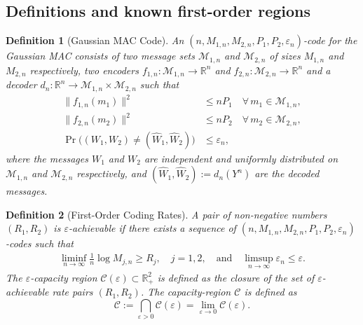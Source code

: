 \documentclass[11pt,onecolumn]{IEEEtran}
\newcommand{\calC}{\mathcal{C}}
\newcommand{\calM}{\mathcal{M}}
\newcommand{\bbR}{\mathbb{R}}
\newcommand{\hatW}{\hat{W}}
\newcommand{\eps}{\varepsilon}
\newtheorem{definition}{Definition}
\begin{document}
\subsection{Definitions and known first-order regions}
\begin{definition}[Gaussian MAC Code] \label{def:code}
An  {\em $(n,M_{1,n},M_{2,n},P_1, P_2,\eps_n)$-code}  for the Gaussian MAC consists of two message sets $\calM_{1,n}$ and $ \calM_{2,n}$ of sizes $M_{1,n}$ and $M_{2,n}$ respectively, two encoders $f_{1,n} : \calM_{1,n}\to \bbR^n$ and      $f_{2,n} : \calM_{2,n}\to\bbR^n$  and a decoder    $d_n : \bbR^n\to \calM_{1,n} \times \calM_{2,n}$ such that
\begin{align}
  \|f_{1,n}(m_1)\|^2 &\le n P_1    \quad\forall  \, m_1 \in \calM_{1,n}  , \label{eqn:power1} \\
 \|f_{2,n}(m_2)\|^2&\le n P_2    \quad\forall \,   m_2 \in  \calM_{2,n}   \label{eqn:power2}, \\
\Pr\big( (W_1, W_2)\ne (\hatW_1,\hatW_2) \big)  &\le\eps_n , \label{eqn:error_prob1}
\end{align}
where the messages $W_1$ and $W_2$ are independent and uniformly distributed on $\calM_{1,n}$ and $\calM_{2,n}$ respectively, and $(\hatW_1,\hatW_2) :=d_n(Y^n)$ are the decoded messages. 
\end{definition}


\begin{definition}[First-Order Coding Rates]
A pair of  non-negative numbers $(R_1, R_2)$ is {\em $\eps$-achievable} if there exists a sequence of $(n,M_{1,n},M_{2,n},P_1, P_2,\eps_n)$-codes such that  
\begin{align}
\liminf_{n\to\infty}\frac{1}{n}\log M_{j,n} \ge R_j,\quad j = 1,2,\quad\mbox{and}\quad \limsup_{n\to\infty}\eps_n \le \eps.
\end{align}
The {\em $\eps$-capacity region} $\calC(\eps) \subset\bbR_+^2$ is defined as the closure of the set of  $\eps$-achievable rate pairs $(R_1, R_2)$.  The {\em capacity-region}  $\calC$ is defined as %
\begin{equation}
\calC:=\bigcap_{\eps > 0}\calC(\eps)=\lim_{\eps\to 0}\calC(\eps).\label{eqn:cap_region}
\end{equation}
\end{definition}
\end{document}
